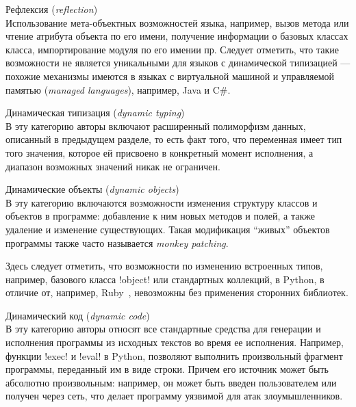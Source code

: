 \begin{description}
  \item Рефлексия (\emph{reflection}) \\ \hfill
      Использование мета-объектных возможностей языка, например,
      вызов метода или чтение атрибута объекта по его имени, получение
      информации о базовых классах класса, импортирование модуля по его имении
      пр. Следует отметить, что такие возможности не является уникальными для
      языков с динамической типизацией --- похожие механизмы имеются в языках с
      виртуальной машиной и управляемой памятью (\emph{managed languages}),
      например, Java и C\#.

  \item Динамическая типизация (\emph{dynamic typing}) \\ \hfill
      В эту категорию авторы включают расширенный полиморфизм данных, описанный
      в предыдущем разделе, то есть факт того, что переменная имеет тип того
      значения, которое ей присвоено в конкретный момент исполнения, а диапазон
      возможных значений никак не ограничен.

  \item Динамические объекты (\emph{dynamic objects}) \\ \hfill
      В эту категорию включаются возможности изменения структуру классов и объектов в
      программе: добавление к ним новых методов и полей, а также удаление и
      изменение существующих. Такая модификация ``живых'' объектов программы также часто
      называется \emph{monkey patching}.

      Здесь следует отметить, что возможности по изменению встроенных
      типов, например, базового класса !object! или стандартных коллекций, в Python, в
      отличие от, например, Ruby~\cite{Madsen2007}, невозможны без применения сторонних библиотек.
      
  \item Динамический код (\emph{dynamic code}) \\ \hfill
      В эту категорию авторы относят все стандартные средства для генерации и
      исполнения программы из исходных текстов во время ее исполнения.
      Например, функции !exec! и !eval! в Python, позволяют выполнить
      произвольный фрагмент программы, переданный им в виде строки.  Причем его
      источник может быть абсолютно произвольным: например, он может быть введен
      пользователем или получен через сеть, что делает программу уязвимой для
      атак злоумышленников.


\end{description}
